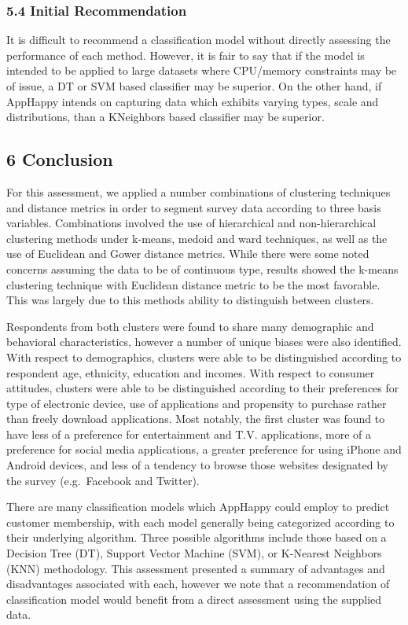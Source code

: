 \documentclass[]{article}
\begin{document}
\subsubsection{5.4 Initial
Recommendation}\label{initial-recommendation-1}

It is difficult to recommend a classification model without directly
assessing the performance of each method. However, it is fair to say
that if the model is intended to be applied to large datasets where
CPU/memory constraints may be of issue, a DT or SVM based classifier may
be superior. On the other hand, if AppHappy intends on capturing data
which exhibits varying types, scale and distributions, than a KNeighbors
based classifier may be superior.

\subsection{6 Conclusion}\label{conclusion}

For this assessment, we applied a number combinations of clustering
techniques and distance metrics in order to segment survey data
according to three basis variables. Combinations involved the use of
hierarchical and non-hierarchical clustering methods under k-means,
medoid and ward techniques, as well as the use of Euclidean and Gower
distance metrics. While there were some noted concerns assuming the data
to be of continuous type, results showed the k-means clustering
technique with Euclidean distance metric to be the most favorable. This
was largely due to this methods ability to distinguish between clusters.

Respondents from both clusters were found to share many demographic and
behavioral characteristics, however a number of unique biases were also
identified. With respect to demographics, clusters were able to be
distinguished according to respondent age, ethnicity, education and
incomes. With respect to consumer attitudes, clusters were able to be
distinguished according to their preferences for type of electronic
device, use of applications and propensity to purchase rather than
freely download applications. Most notably, the first cluster was found
to have less of a preference for entertainment and T.V. applications,
more of a preference for social media applications, a greater preference
for using iPhone and Android devices, and less of a tendency to browse
those websites designated by the survey (e.g.~Facebook and Twitter).

There are many classification models which AppHappy could employ to
predict customer membership, with each model generally being categorized
according to their underlying algorithm. Three possible algorithms
include those based on a Decision Tree (DT), Support Vector Machine
(SVM), or K-Nearest Neighbors (KNN) methodology. This assessment
presented a summary of advantages and disadvantages associated with
each, however we note that a recommendation of classification model
would benefit from a direct assessment using the supplied data.
\end{document}
